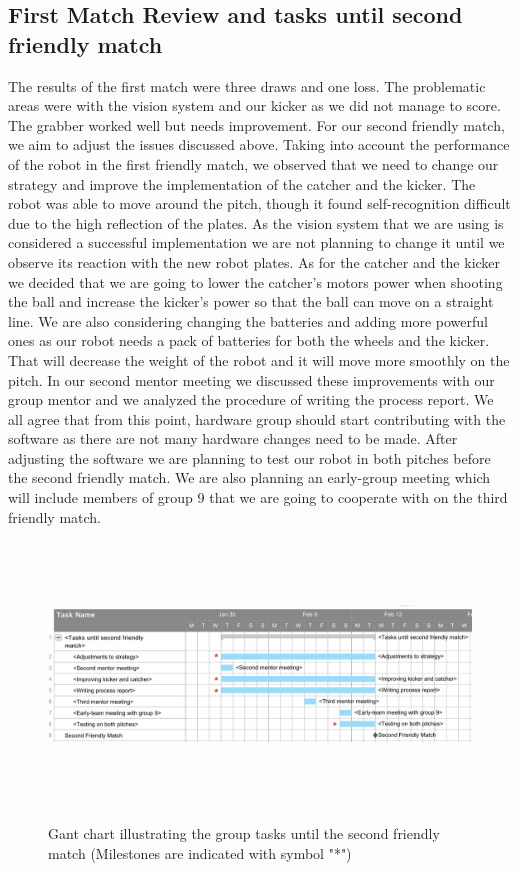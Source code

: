 \documentclass{article}
\begin{document}
\subsection{First Match Review and tasks until second friendly match}
The results of the first match were three draws and one loss. The problematic areas were with the vision system and our kicker as we did not manage to score. The grabber worked well but needs improvement.
For our second friendly match, we aim to adjust the issues discussed above. Taking into account the performance of the robot in the first friendly match, we observed that we need to change our strategy and improve the implementation of the catcher and the kicker. The robot was able to move around the pitch, though it found self-recognition difficult due to the high reflection of the plates. As the vision system that we are using is considered a successful implementation we are not planning to change it until we observe its reaction with the new robot plates. As for the catcher and the kicker we decided that we are going to lower the catcher's motors power when shooting the ball and increase the kicker's power so that the ball can move on a straight line. We are also considering changing the batteries and adding more powerful ones as our robot needs a pack of batteries for both the wheels and the kicker. That will decrease the weight of the robot and it will move more smoothly on the pitch. In our second mentor meeting we discussed these improvements with our group mentor and we analyzed the procedure of writing the process report. We all agree that from this point, hardware group should start contributing with the software as there are not many hardware changes need to be made. After adjusting the software we are planning to test our robot in both pitches before the second friendly match. We are also planning an early-group meeting which will include members of group 9 that we are going to cooperate with on the third friendly match.

\begin{figure}[H]
	\centering
	\begin{minipage}{1\textwidth}
		\centering
		\includegraphics[width=16cm, height=7cm]{SecondFriendlyMatch.png}\\
		\caption{Gant chart illustrating the group tasks until the second friendly match (Milestones are indicated with symbol "*")}
	\end{minipage}%
\end{figure}
\end{document}
